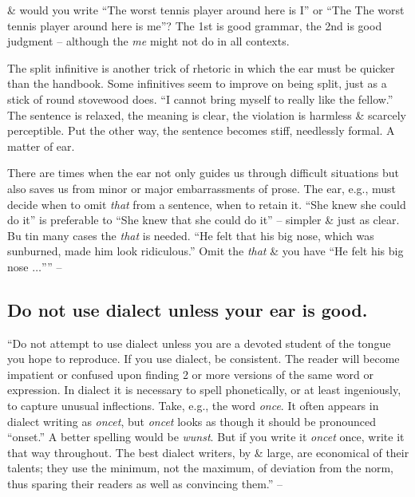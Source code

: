 \documentclass{article}
\numberwithin{equation}{section}
\begin{document}
\& would you write ``The worst tennis player around here is I'' or ``The The worst tennis player around here is me''? The 1st is good grammar, the 2nd is good judgment -- although the \textit{me} might not do in all contexts.

The split infinitive is another trick of rhetoric in which the ear must be quicker than the handbook. Some infinitives seem to improve on being split, just as a stick of round stovewood does. ``I cannot bring myself to really like the fellow.'' The sentence is relaxed, the meaning is clear, the violation is harmless \& scarcely perceptible. Put the other way, the sentence becomes stiff, needlessly formal. A matter of ear.

There are times when the ear not only guides us through difficult situations but also saves us from minor or major embarrassments of prose. The ear, e.g., must decide when to omit \textit{that} from a sentence, when to retain it. ``She knew she could do it'' is preferable to ``She knew that she could do it'' -- simpler \& just as clear. Bu tin many cases the \textit{that} is needed. ``He felt that his big nose, which was sunburned, made him look ridiculous.'' Omit the \textit{that} \& you have ``He felt his big nose $\ldots$'''' -- \cite[p. 93]{Strunk_White2019}


\subsection{Do not use dialect unless your ear is good.}
``Do not attempt to use dialect unless you are a devoted student of the tongue you hope to reproduce. If you use dialect, be consistent. The reader will become impatient or confused upon finding 2 or more versions of the same word or expression. In dialect it is necessary to spell phonetically, or at least ingeniously, to capture unusual inflections. Take, e.g., the word \textit{once}. It often appears in dialect writing as \textit{oncet}, but \textit{oncet} looks as though it should be pronounced ``onset.'' A better spelling would be \textit{wunst}. But if you write it \textit{oncet} once, write it that way throughout. The best dialect writers, by \& large, are economical of their talents; they use the minimum, not the maximum, of deviation from the norm, thus sparing their readers as well as convincing them.'' -- \cite[p. 94]{Strunk_White2019}

\end{document}
